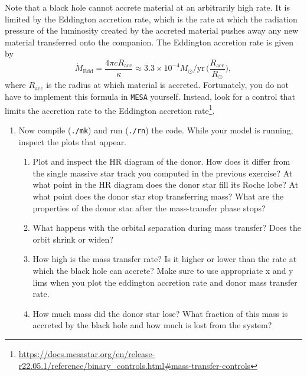 \documentclass[11pt,a4paper]{article}
\begin{document}
  \noindent
  Note that a black hole cannot accrete material at an arbitrarily high rate. It is limited by the Eddington accretion rate, which is the rate at which the radiation pressure of the luminosity created by the accreted material pushes away any new material transferred onto the companion. The Eddington accretion rate is given by
  \begin{equation*}
  \dot{M}_{\mathrm{Edd}} = \frac{4\pi cR_{\mathrm{acc}}}{\kappa} \approx 3.3 \times 10^{-4} M_\odot/\mathrm{yr}\, \bigg(\frac{R_{\mathrm{acc}}}{R_\odot}\bigg),
  \end{equation*}
  where $R_{\mathrm{acc}}$ is the radius at which material is accreted. Fortunately, you do not have to implement this formula in \texttt{MESA} yourself. Instead, look for a control that limits the accretion rate to the Eddington accretion rate\footnote{\url{https://docs.mesastar.org/en/release-r22.05.1/reference/binary_controls.html\#mass-transfer-controls}}.

  \begin{enumerate}
  \addtocounter{enumi}{2}
  \item Now compile (\verb|./mk|) and run (\verb|./rn|) the code. While your model is running, inspect the plots that appear.
  \begin{enumerate}

  \item Plot and inspect the HR diagram of the donor. How does it differ from the single massive star track you computed in the previous exercise? At what point in the HR diagram does the donor star fill its Roche lobe? At what point does the donor star stop transferring mass? What are the properties of the donor star after the mass-transfer phase stops?

  \item What happens with the orbital separation during mass transfer? Does the orbit shrink or widen?

  \item How high is the mass transfer rate? Is it higher or lower than the rate at which the black hole can accrete?  Make sure to use appropriate x and y lims when you plot the eddington accretion rate and donor mass transfer rate. 

  \item How much mass did the donor star lose? What fraction of this mass is accreted by the black hole and how much is lost from the system?

  \end{enumerate}

\end{enumerate}
\end{document}
